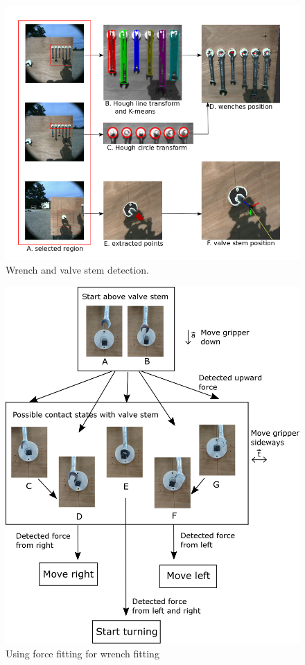 \documentclass{standalone}
\begin{document}
\begin{figure}
  \includegraphics[width=\columnwidth]{sections/task2/images/detection}
  \caption{Wrench and valve stem detection.}
  \label{fig:figure3}
\end{figure}

\begin{figure}
  \includegraphics[width=\columnwidth]{sections/task2/images/figure4}
  \caption{Using force fitting for wrench fitting}
  \label{fig:figure4}
\end{figure}
\end{document}
